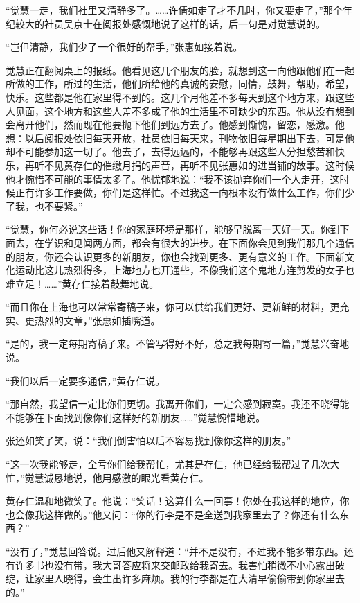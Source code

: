 \par “觉慧一走，我们社里又清静多了。……许倩如走了才不几时，你又要走了，”那个年纪较大的社员吴京士在阅报处感慨地说了这样的话，后一句是对觉慧说的。
\par “岂但清静，我们少了一个很好的帮手，”张惠如接着说。
\par 觉慧正在翻阅桌上的报纸。他看见这几个朋友的脸，就想到这一向他跟他们在一起所做的工作，所过的生活，他们所给他的真诚的安慰，同情，鼓舞，帮助，希望，快乐。这些都是他在家里得不到的。这几个月他差不多每天到这个地方来，跟这些人见面，这个地方和这些人差不多成了他的生活里不可缺少的东西。他从没有想到会离开他们，然而现在他要抛下他们到远方去了。他感到惭愧，留恋，感激。他想：以后阅报处依旧每天开放，社员依旧每天来，刊物依旧每星期出下去，可是他却不可能参加这一切了。他去了，去得远远的，不能够再跟这些人分担愁苦和快乐，再听不见黄存仁的催缴月捐的声音，再听不见张惠如的进当铺的故事。这时候他才惋惜不可能的事情太多了。他忧郁地说：“我不该抛弃你们一个人走开，这时候正有许多工作要做，你们是这样忙。不过我这一向根本没有做什么工作，你们少了我，也不要紧。”
\par “觉慧，你何必说这些话！你的家庭环境是那样，能够早脱离一天好一天。你到下面去，在学识和见闻两方面，都会有很大的进步。在下面你会见到我们那几个通信的朋友，你还会认识更多的新朋友，你也会找到更多、更有意义的工作。下面新文化运动比这儿热烈得多，上海地方也开通些，不像我们这个鬼地方连剪发的女子也难立足！……”黄存仁接着鼓舞地说。
\par “而且你在上海也可以常常寄稿子来，你可以供给我们更好、更新鲜的材料，更充实、更热烈的文章，”张惠如插嘴道。
\par “是的，我一定每期寄稿子来。不管写得好不好，总之我每期寄一篇，”觉慧兴奋地说。
\par “我们以后一定要多通信，”黄存仁说。
\par “那自然，我望信一定比你们更切。我离开你们，一定会感到寂寞。我还不晓得能不能够在下面找到像你们这样好的新朋友……”觉慧惋惜地说。
\par 张还如笑了笑，说：“我们倒害怕以后不容易找到像你这样的朋友。”
\par “这一次我能够走，全亏你们给我帮忙，尤其是存仁，他已经给我帮过了几次大忙，”觉慧诚恳地说，他用感激的眼光看黄存仁。
\par 黄存仁温和地微笑了。他说：“笑话！这算什么一回事！你处在我这样的地位，你也会像我这样做的。”他又问：“你的行李是不是全送到我家里去了？你还有什么东西？”
\par “没有了，”觉慧回答说。过后他又解释道：“并不是没有，不过我不能多带东西。还有许多书也没有带，我大哥答应将来交邮政给我寄去。我害怕稍微不小心露出破绽，让家里人晓得，会生出许多麻烦。我的行李都是在大清早偷偷带到你家里去的。”
